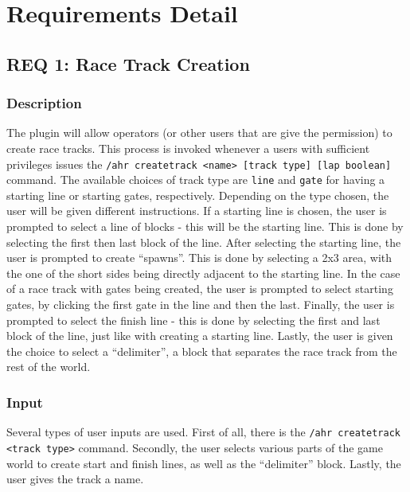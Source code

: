\documentclass[a4paper, 11pt]{article} %
\begin{document}
\newpage

\section{Requirements Detail}

\subsection{REQ 1: Race Track Creation}

\subsubsection{Description}

The plugin will allow operators (or other users that are give the permission) to create race tracks. This process is invoked whenever a users with sufficient privileges issues the \verb;/ahr createtrack <name> [track type] [lap boolean]; command. The available choices of track type are \verb;line; and \verb;gate; for having a starting line or starting gates, respectively. Depending on the type chosen, the user will be given different instructions. If a starting line is chosen, the user is prompted to select a line of blocks - this will be the starting line. This is done by selecting the first then last block of the line. After selecting the starting line, the user is prompted to create ``spawns''. This is done by selecting a 2x3 area, with the one of the short sides being directly adjacent to the starting line. In the case of a race track with gates being created, the user is prompted to select starting gates, by clicking the first gate in the line and then the last. Finally, the user is prompted to select the finish line - this is done by selecting the first and last block of the line, just like with creating a starting line. Lastly, the user is given the choice to select a ``delimiter'', a block that separates the race track from the rest of the world.

\subsubsection{Input}

Several types of user inputs are used. First of all, there is the \verb;/ahr createtrack <track type>; command. Secondly, the user selects various parts of the game world to create start and finish lines, as well as the ``delimiter'' block. Lastly, the user gives the track a name.
\end{document}

